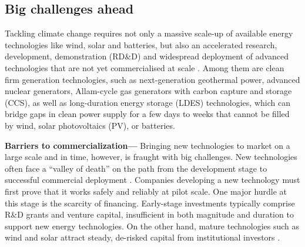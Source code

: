 \documentclass[pdflatex,sn-basic, Numbered]{sn-jnl}%
\theoremstyle{thmstyleone}%
\theoremstyle{thmstyletwo}%
\theoremstyle{thmstylethree}%
\begin{document}



\maketitle

\subsection*{Big challenges ahead}\label{sec1}

Tackling climate change requires not only a massive scale-up of available energy technologies like wind, solar and batteries, but also an accelerated research, development, demonstration (RD\&D) and widespread deployment of advanced technologies that are not yet commercialised at scale \cite{sepulvedaRoleFirmLowCarbon2018, bistlineImpactCarbonDioxide2021, brownUltralongdurationEnergyStorage2023, ieaNetZero20502021}.
Among them are clean firm generation technologies, such as next-generation geothermal power, advanced nuclear generators, Allam-cycle gas generators with carbon capture and storage (CCS), as well as long-duration energy storage (LDES) technologies, which can bridge gaps in clean power supply for a few days to weeks that cannot be filled by wind, solar photovoltaics (PV), or batteries.

\textbf{Barriers to commercialization---} Bringing new technologies to market on a large scale and in time, however, is fraught with big challenges.
New technologies often face a \enquote{valley of death} on the path from the development stage to successful commercial deployment \cite{gatesFinancingCleanIndustrial2021, google-advancedtech}.
Companies developing a new technology must first prove that it works safely and reliably at pilot scale.
One major hurdle at this stage is the scarcity of financing. Early-stage investments typically comprise R\&D grants and venture capital, insufficient in both magnitude and duration to support new energy technologies. On the other hand, mature technologies such as wind and solar attract steady, de-risked capital from institutional investors \cite{google-advancedtech, khatcherianBarriersTimelyDeployment2022}.
\end{document}
